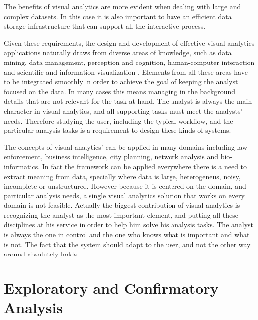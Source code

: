 The benefits of visual analytics are more evident when dealing with large and complex datasets. In this case it is also important
to have an efficient data storage infrastructure that can support all the interactive process.

Given these requirements, the design and development of effective visual analytics
applications naturally draws from diverse areas of knowledge, such as data mining, data management, perception and cognition, human-computer interaction and scientific and information visualization \autocite{keim_visual_2008}. Elements from all these areas have to be integrated smoothly in order to achieve the goal of keeping the analyst focused on the data. In many cases this means managing in the background details that are not relevant for the task at hand. The analyst is always the main character in visual analytics, and all supporting tasks must meet the analysts' needs. Therefore studying the user, including the typical workflow, and the particular analysis tasks is a requirement to design these kinds of systems.


The concepts of visual analytics'  can be applied in many domains including law enforcement, business intelligence, city planning, network analysis and bio-informatics. In fact the framework can be applied everywhere there is a need to extract meaning from data, specially where data is large, heterogeneus, noisy, incomplete or unstructured. However because it is centered on the domain, and particular analysis needs, a single visual analytics solution that works on every domain is not feasible. Actually the biggest contribution of visual analytics is recognizing the analyst as the most important element, and putting all these disciplines at his service in order to help him solve his analysis tasks. The analyst is always the one in control and the one who knows what is important and what is not. The fact that the system should adapt to the user, and not the other way around \autocite{norman_design_2002} absolutely holds.



\section{Exploratory and Confirmatory Analysis}

